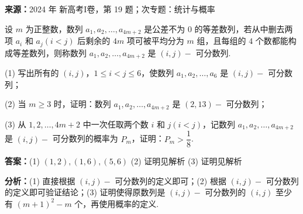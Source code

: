 \begin{question}[points=17]
\textbf{来源：}2024 年 新高考I卷，第 19 题；次专题：统计与概率\par
设 $m$ 为正整数，数列 $a_1,a_2,\ldots,a_{4m+2}$ 是公差不为 $0$ 的等差数列，若从中删去两项 $a_i$ 和 $a_j(i<j)$ 后剩余的 $4m$ 项可被平均分为 $m$ 组，且每组的 $4$ 个数都能构成等差数列，则称数列 $a_1,a_2,\ldots,a_{4m+2}$ 是 $(i,j)-$ 可分数列.

(1) 写出所有的 $(i,j)$，$1\le i<j\le 6$，使数列 $a_1,a_2,\ldots,a_6$ 是 $(i,j)-$ 可分数列；

(2) 当 $m\ge 3$ 时，证明：数列 $a_1,a_2,\ldots,a_{4m+2}$ 是 $(2,13)-$ 可分数列；

(3) 从 $1,2,\ldots,4m+2$ 中一次任取两个数 $i$ 和 $j(i<j)$，记数列 $a_1,a_2,\ldots,a_{4m+2}$ 是 $(i,j)-$ 可分数列的概率为 $P_m$，证明：$P_m>\dfrac{1}{8}$.
\begin{solution}
\textbf{答案：}(1) $(1,2),(1,6),(5,6)$ (2) 证明见解析 (3) 证明见解析

\textbf{分析：}(1) 直接根据 $(i,j)-$ 可分数列的定义即可；(2) 根据 $(i,j)-$ 可分数列的定义即可验证结论；(3) 证明使得原数列是 $(i,j)-$ 可分数列的 $(i,j)$ 至少有 $(m+1)^2-m$ 个，再使用概率的定义.


\end{solution}
\end{question}
